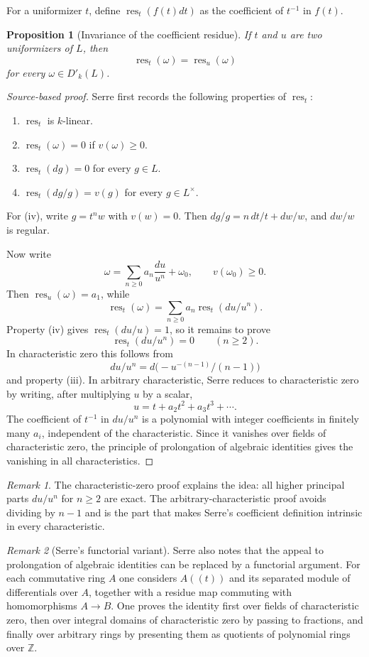 \documentclass[11pt,a4paper]{article}
\newcommand{\res}{\operatorname{res}}
\theoremstyle{definition}
\theoremstyle{plain}
\newtheorem{proposition}[definition]{Proposition}
\theoremstyle{remark}
\newtheorem*{remark}{Remark}
\begin{document}
For a uniformizer $t$, define $\res_t(f(t)dt)$ as the coefficient of $t^{-1}$ in $f(t)$.

\begin{proposition}[Invariance of the coefficient residue]
If $t$ and $u$ are two uniformizers of $L$, then
\[
  \res_t(\omega)=\res_u(\omega)
\]
for every $\omega\in D'_k(L)$.
\end{proposition}

\begin{proof}[Source-based proof]
Serre first records the following properties of $\res_t$:
\begin{enumerate}[label=(\roman*)]
\item $\res_t$ is $k$-linear.
\item $\res_t(\omega)=0$ if $v(\omega)\ge 0$.
\item $\res_t(dg)=0$ for every $g\in L$.
\item $\res_t(dg/g)=v(g)$ for every $g\in L^\times$.
\end{enumerate}
For (iv), write $g=t^nw$ with $v(w)=0$.  Then $dg/g=n\,dt/t+dw/w$, and $dw/w$ is regular.

Now write
\[
  \omega=\sum_{n\ge 0} a_n\frac{du}{u^n}+\omega_0,
  \qquad v(\omega_0)\ge 0.
\]
Then $\res_u(\omega)=a_1$, while
\[
  \res_t(\omega)=\sum_{n\ge0}a_n\res_t(du/u^n).
\]
Property (iv) gives $\res_t(du/u)=1$, so it remains to prove
\[
  \res_t(du/u^n)=0\qquad(n\ge2).
\]
In characteristic zero this follows from
\[
  du/u^n=d\bigl(-u^{-(n-1)}/(n-1)\bigr)
\]
and property (iii).  In arbitrary characteristic, Serre reduces to characteristic zero by writing, after multiplying $u$ by a scalar,
\[
  u=t+a_2t^2+a_3t^3+\cdots.
\]
The coefficient of $t^{-1}$ in $du/u^n$ is a polynomial with integer coefficients in finitely many $a_i$, independent of the characteristic.  Since it vanishes over fields of characteristic zero, the principle of prolongation of algebraic identities gives the vanishing in all characteristics.
\end{proof}

\begin{remark}
The characteristic-zero proof explains the idea: all higher principal parts $du/u^n$ for $n\ge2$ are exact.  The arbitrary-characteristic proof avoids dividing by $n-1$ and is the part that makes Serre's coefficient definition intrinsic in every characteristic.
\end{remark}

\begin{remark}[Serre's functorial variant]
Serre also notes that the appeal to prolongation of algebraic identities can be replaced by a functorial argument.  For each commutative ring $A$ one considers $A((t))$ and its separated module of differentials over $A$, together with a residue map commuting with homomorphisms $A\to B$.  One proves the identity first over fields of characteristic zero, then over integral domains of characteristic zero by passing to fractions, and finally over arbitrary rings by presenting them as quotients of polynomial rings over $\mathbb Z$.
\end{remark}
\end{document}
